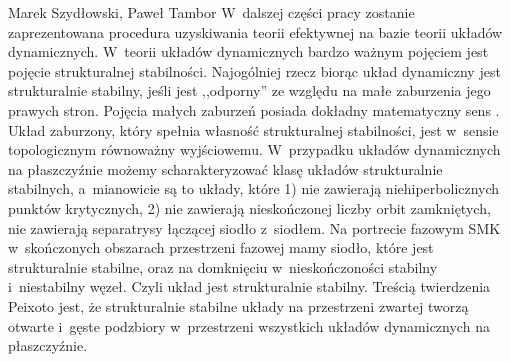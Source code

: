 \begin{artplenv2auth}{Marek Szydłowski, Paweł Tambor}
W~dalszej części pracy zostanie zaprezentowana procedura uzyskiwania teorii efektywnej na bazie teorii układów dynamicznych. W~teorii układów dynamicznych bardzo ważnym pojęciem jest pojęcie strukturalnej stabilności. Najogólniej rzecz biorąc układ dynamiczny jest strukturalnie stabilny, jeśli jest ,,odporny'' ze względu na małe zaburzenia jego prawych stron. Pojęcia małych zaburzeń posiada dokładny matematyczny sens
\parencite{tambor_czy_2017}.
Układ zaburzony, który spełnia własność strukturalnej stabilności, jest w~sensie topologicznym równoważny wyjściowemu. W~przypadku układów dynamicznych na płaszczyźnie możemy scharakteryzować klasę układów strukturalnie stabilnych, a~mianowicie są to układy, które 1) nie zawierają niehiperbolicznych punktów krytycznych, 2) nie zawierają nieskończonej liczby orbit zamkniętych, nie zawierają separatrysy łączącej siodło z~siodłem. Na portrecie fazowym SMK w~skończonych obszarach przestrzeni fazowej mamy siodło, które jest strukturalnie stabilne, oraz na domknięciu w~nieskończoności stabilny i~niestabilny węzeł. Czyli układ jest strukturalnie stabilny. Treścią twierdzenia Peixoto jest, że strukturalnie stabilne układy na przestrzeni zwartej tworzą otwarte i~gęste podzbiory w~przestrzeni wszystkich układów dynamicznych na płaszczyźnie.


\end{artplenv2auth}
